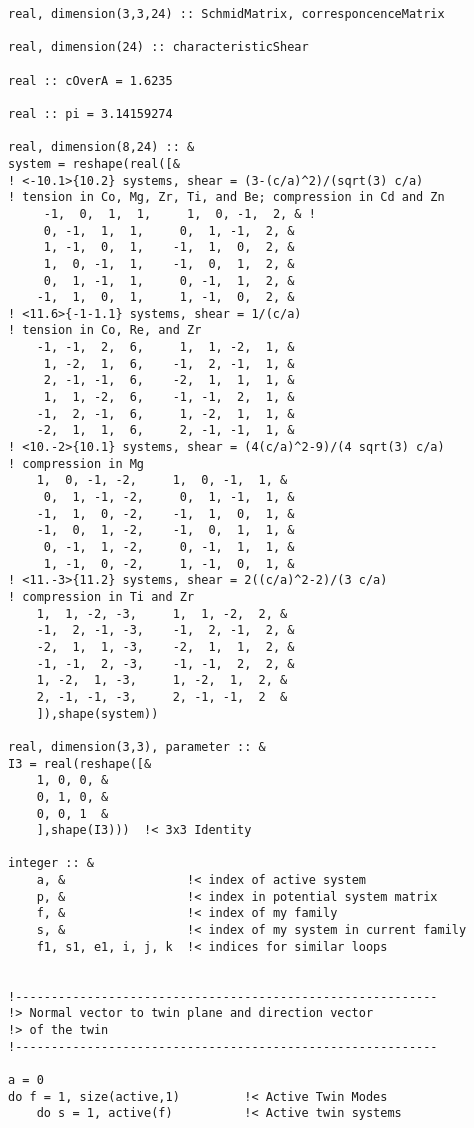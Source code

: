 \begin{verbatim}
real, dimension(3,3,24) :: SchmidMatrix, corresponcenceMatrix

real, dimension(24) :: characteristicShear

real :: cOverA = 1.6235

real :: pi = 3.14159274 

real, dimension(8,24) :: &
system = reshape(real([&
! <-10.1>{10.2} systems, shear = (3-(c/a)^2)/(sqrt(3) c/a)
! tension in Co, Mg, Zr, Ti, and Be; compression in Cd and Zn
     -1,  0,  1,  1,     1,  0, -1,  2, & !
     0, -1,  1,  1,     0,  1, -1,  2, &
     1, -1,  0,  1,    -1,  1,  0,  2, &
     1,  0, -1,  1,    -1,  0,  1,  2, &
     0,  1, -1,  1,     0, -1,  1,  2, &
    -1,  1,  0,  1,     1, -1,  0,  2, &
! <11.6>{-1-1.1} systems, shear = 1/(c/a)
! tension in Co, Re, and Zr
    -1, -1,  2,  6,     1,  1, -2,  1, &
     1, -2,  1,  6,    -1,  2, -1,  1, &
     2, -1, -1,  6,    -2,  1,  1,  1, &
     1,  1, -2,  6,    -1, -1,  2,  1, &
    -1,  2, -1,  6,     1, -2,  1,  1, &
    -2,  1,  1,  6,     2, -1, -1,  1, &
! <10.-2>{10.1} systems, shear = (4(c/a)^2-9)/(4 sqrt(3) c/a)
! compression in Mg
    1,  0, -1, -2,     1,  0, -1,  1, &
     0,  1, -1, -2,     0,  1, -1,  1, &
    -1,  1,  0, -2,    -1,  1,  0,  1, &
    -1,  0,  1, -2,    -1,  0,  1,  1, &
     0, -1,  1, -2,     0, -1,  1,  1, &
     1, -1,  0, -2,     1, -1,  0,  1, &
! <11.-3>{11.2} systems, shear = 2((c/a)^2-2)/(3 c/a)
! compression in Ti and Zr
    1,  1, -2, -3,     1,  1, -2,  2, &
    -1,  2, -1, -3,    -1,  2, -1,  2, &
    -2,  1,  1, -3,    -2,  1,  1,  2, &
    -1, -1,  2, -3,    -1, -1,  2,  2, &
    1, -2,  1, -3,     1, -2,  1,  2, &
    2, -1, -1, -3,     2, -1, -1,  2  &
    ]),shape(system))

real, dimension(3,3), parameter :: &
I3 = real(reshape([&
    1, 0, 0, &
    0, 1, 0, &
    0, 0, 1  &
    ],shape(I3)))  !< 3x3 Identity

integer :: &
    a, &                 !< index of active system
    p, &                 !< index in potential system matrix
    f, &                 !< index of my family
    s, &                 !< index of my system in current family
    f1, s1, e1, i, j, k  !< indices for similar loops


!-----------------------------------------------------------
!> Normal vector to twin plane and direction vector 
!> of the twin
!-----------------------------------------------------------
    
a = 0
do f = 1, size(active,1)         !< Active Twin Modes
    do s = 1, active(f)          !< Active twin systems
            

\end{verbatim}
